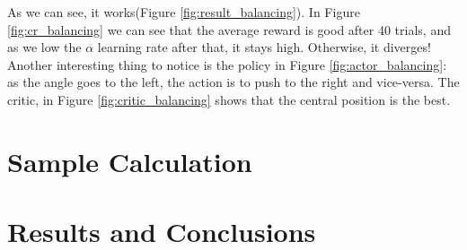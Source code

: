 \documentclass{article}
\begin{document}
As we can see, it works(Figure \ref{fig:result_balancing}). In Figure \ref{fig:cr_balancing} we can see that the average reward is good after 40 trials, and as we low the $\alpha$ learning rate after that, it stays high. Otherwise, it diverges! Another interesting thing to notice is the policy in Figure \ref{fig:actor_balancing}: as the angle goes to the left, the action is to push to the right and vice-versa. The critic, in Figure \ref{fig:critic_balancing} shows that the central position is the best.


\section{Sample Calculation}



\section{Results and Conclusions}






\end{document}
